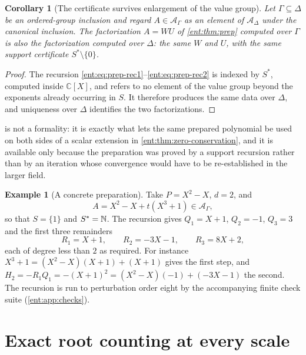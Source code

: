 \documentclass[11pt]{article}
\theoremstyle{plain}
\theoremstyle{plain}
\theoremstyle{plain}
\newtheorem{corollary}[corollary]{Corollary}
\theoremstyle{definition}
\theoremstyle{definition}
\theoremstyle{definition}
\newtheorem{example}[example]{Example}
\theoremstyle{definition}
\theoremstyle{remark}
\newcommand{\C}{\mathbb C}\newcommand{\R}{\mathbb R}
\newcommand{\A}{\mathcal A_\Gamma}\newcommand{\OO}{\mathcal O_\Gamma}
\begin{document}
\begin{corollary}[The certificate survives enlargement of the value group]
\label{ent:cor:prep-extension}
Let $\Gamma\subseteq\Delta$ be an ordered-group inclusion and regard
$A\in\A$ as an element of $\mathcal A_\Delta$ under the canonical inclusion.
The factorization $A=WU$ of \cref{ent:thm:prep} computed over $\Gamma$ is
also the factorization computed over $\Delta$: the same $W$ and $U$, with the
same support certificate $S^*\setminus\{0\}$.
\end{corollary}
\begin{proof}
The recursion \eqref{ent:eq:prep-rec1}--\eqref{ent:eq:prep-rec2} is indexed
by $S^*$, computed inside $\C[X]$, and refers to no element of the value
group beyond the exponents already occurring in $S$. It therefore produces
the same data over $\Delta$, and uniqueness over $\Delta$ identifies the two
factorizations.
\end{proof}

 is not a formality: it is exactly what lets the
same prepared polynomial be used on both sides of a scalar extension in
\cref{ent:thm:zero-conservation}, and it is available only because the
preparation was proved by a support recursion rather than by an iteration
whose convergence would have to be re-established in the larger field.

\begin{example}[A concrete preparation]\label{ent:ex:cubic}
Take $P=X^2-X$, $d=2$, and
\begin{equation}\label{ent:eq:cubic}
 A=X^2-X+t(X^3+1)\in\A,
\end{equation}
so that $S=\{1\}$ and $S^*=\mathbb N$. The recursion gives $Q_1=X+1$, $Q_2=-1$,
$Q_3=3$ and the first three remainders
\[
 R_1=X+1,\qquad R_2=-3X-1,\qquad R_3=8X+2,
\]
each of degree less than $2$ as required. For instance
$X^3+1=(X^2-X)(X+1)+(X+1)$ gives the first step, and
$H_2=-R_1Q_1=-(X+1)^2=(X^2-X)(-1)+(-3X-1)$ the second. The recursion is run
to perturbation order eight by the accompanying finite check suite
(\cref{ent:app:checks}).
\end{example}

\section{Exact root counting at every scale}
\label{ent:sec:zeros}
\end{document}

